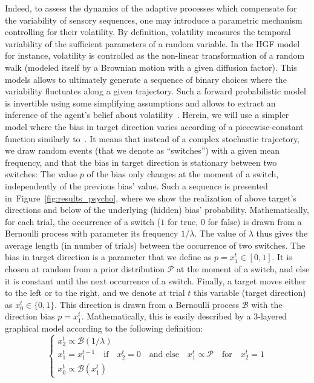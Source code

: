\documentclass[profile,final,english, draft]{article}%
\newcommand{\choice}[1]{ %
	\left\{ %
		\begin{array}{l} #1 \end{array} %
	\right. }
\newcommand{\eql}[1]{\begin{equation}#1\end{equation}}
\newcommand{\Bb}{\mathcal{B}}
\newcommand{\Pp}{\mathcal{P}}
\newcommand{\citep}[1]{\parencite{#1}}
\newcommand{\citet}[1]{\textcite{#1}}
\newcommand{\seeFig}[1]{Figure~\ref{fig:#1}}
\begin{document}
Indeed, to assess the dynamics of the adaptive processes
which compensate for the variability of sensory sequences,
one may introduce a parametric mechanism controlling for their volatility.
By definition, volatility measures the temporal variability
of the sufficient parameters of a random variable.
In the HGF model~\citep{Matthys2011} for instance,
volatility is controlled as the non-linear transformation
of a random walk (modeled itself by a Brownian motion with a given diffusion factor).
This models allows to ultimately generate a sequence of binary choices
where the variability fluctuates along a given trajectory.
Such a forward probabilistic model is invertible
using some simplifying assumptions and allows
to extract an inference of the agent's belief about volatility~\citep{Voessel??}.
Herein, we will use a simpler model where
the bias in target direction varies according of a piecewise-constant function
similarly to~\citet{Meyniel13}.
It means that instead of a complex stochastic trajectory,
we draw random events (that we denote as ``switches'')
with a given mean frequency,
and that the bias in target direction is stationary between two switches:
The value $p$ of the bias only changes at the moment of a switch,
independently of the previous bias' value.
Such a sequence is presented in~\seeFig{results_psycho},
where we show the realization of above target's directions and
below of the underlying (hidden) bias' probability.
Mathematically, for each trial,
the occurrence of a switch ($1$ for true, $0$ for false)
is  drawn from a Bernoulli process with parameter its frequency $1/\lambda$.
The value of $\lambda$ thus gives the average length (in number of trials)
between the occurrence of two switches.
The bias in target direction is a parameter that we define as $p=x_1^t \in [0, 1]$.
It is chosen at random from a prior distribution $\Pp$ at the moment of a switch,
and else it is constant until the next occurrence of a switch.
Finally, a target moves either to the left or to the right,
and we denote at trial $t$ this variable (target direction) as $x_0^t\in \{ 0, 1 \}$.
This direction is drawn from a Bernoulli process $\Bb$
with the direction bias $p=x_1^t$.
Mathematically, this is easily described
by a 3-layered graphical model according to %
the following definition:
\eql{\choice{
x_2^t \propto \Bb(1/\lambda) \\
x_1^t = x_1^{t-1} \quad \text{if} \quad x_2^t=0 \quad \text{and else} \quad x_1^t \propto \Pp \quad \text{for} \quad x_2^t=1 \\
x_0^t \propto \Bb(x_1^t)
}\label{eq:sgm}}
\end{document}
